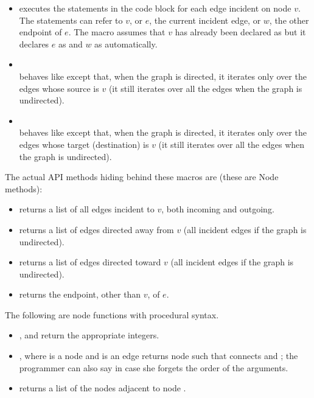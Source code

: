 \begin{itemize}

\item
{}
executes the statements in the code block for each edge incident on node $v$.
The statements can refer to $v$, or $e$, the current incident edge,
or $w$, the other endpoint of $e$.
The macro assumes that $v$ has already been declared as 
but it declares $e$ as  and $w$ as  automatically.

\item
{}\\
behaves like  except that, when the graph is directed,
it iterates only over the edges whose source is $v$ (it still iterates over all the edges when the graph is undirected). 

\item
{}\\
behaves like  except that, when the graph is directed,
it iterates only over the edges whose target (destination) is $v$ (it still iterates over all the edges when the graph is undirected). 

\end{itemize}

The actual API methods hiding behind these macros are (these are Node methods):

\begin{itemize}
\item
{} returns a list of all edges
incident to $v$, both incoming and outgoing.
\item
{} returns a list of edges
directed away from $v$ (all incident edges if the graph is undirected).
\item
{} returns a list of edges
directed toward $v$ (all incident edges if the graph is undirected).
\item
{} returns the endpoint, other than $v$, of $e$.
\end{itemize}

The following are node functions with procedural syntax.

\begin{itemize}
\item {},  and  return the appropriate
integers.
\item {}, where  is a node and  is an edge
returns node  such that  connects  and ;
the programmer can also say  in case she forgets the order
of the arguments.
\item {} returns a list of the nodes adjacent to node .
\end{itemize}

